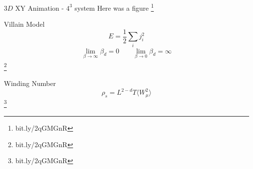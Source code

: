 \documentclass[10pt]{beamer}
\newcommand\blfootnote[1]{%
  \begingroup
  \renewcommand\thefootnote{}\footnote{#1}%
  \addtocounter{footnote}{-1}%
  \endgroup
}
\begin{document}



\begin{frame}{$3D$ XY Animation - $4^3$ system}
        Here was a figure
   \blfootnote{bit.ly/2qGMGnR}
\end{frame}

\begin{frame}{Villain Model}
    \begin{equation*}
        E = \frac{1}{2} \sum_i j_i^2
    \end{equation*}
    \begin{align*}
        \lim_{\beta \to \infty} \beta_d = 0 \qquad \lim_{\beta \to 0} \beta_d = \infty
    \end{align*}
    \blfootnote{bit.ly/2qGMGnR}
\end{frame}

\begin{frame}{Winding Number}
    \begin{equation*}
        \rho_s = L^{2 - d} T \langle W_\mu^2 \rangle 
    \end{equation*}
    \blfootnote{bit.ly/2qGMGnR}
\end{frame}
\end{document}
